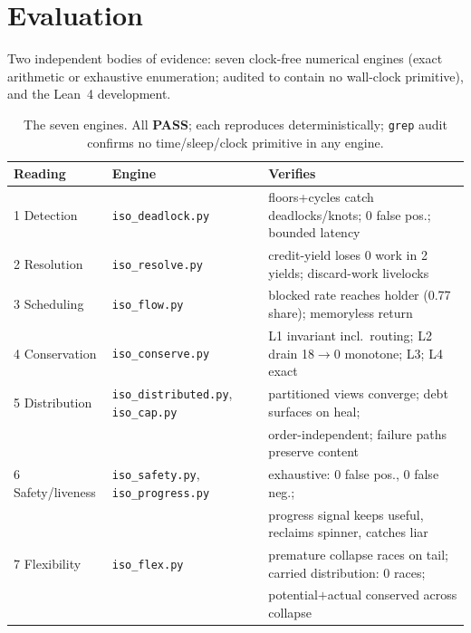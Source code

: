 \documentclass[11pt]{article}
\begin{document}
\section{Evaluation}
\label{sec:eval}

Two independent bodies of evidence: seven clock-free numerical engines
(exact arithmetic or exhaustive enumeration; audited to contain no
wall-clock primitive), and the Lean~4 development.

\begin{table}[h]
\centering
\small
\begin{tabular}{lll}
\toprule
Reading & Engine & Verifies \\
\midrule
1 Detection & \texttt{iso\_deadlock.py} & floors+cycles catch deadlocks/knots; 0 false pos.; bounded latency \\
2 Resolution & \texttt{iso\_resolve.py} & credit-yield loses 0 work in 2 yields; discard-work livelocks \\
3 Scheduling & \texttt{iso\_flow.py} & blocked rate reaches holder (0.77 share); memoryless return \\
4 Conservation & \texttt{iso\_conserve.py} & L1 invariant incl.\ routing; L2 drain 18$\to$0 monotone; L3; L4 exact \\
5 Distribution & \texttt{iso\_distributed.py}, \texttt{iso\_cap.py} & partitioned views converge; debt surfaces on heal; \\
& & order-independent; failure paths preserve content \\
6 Safety/liveness & \texttt{iso\_safety.py}, \texttt{iso\_progress.py} & exhaustive: 0 false pos., 0 false neg.; \\
& & progress signal keeps useful, reclaims spinner, catches liar \\
7 Flexibility & \texttt{iso\_flex.py} & premature collapse races on tail; carried distribution: 0 races; \\
& & potential$+$actual conserved across collapse \\
\bottomrule
\end{tabular}
\caption{The seven engines. All \textbf{PASS}; each reproduces
deterministically; \texttt{grep} audit confirms no time/sleep/clock
primitive in any engine.}
\label{tab:engines}
\end{table}
\end{document}
